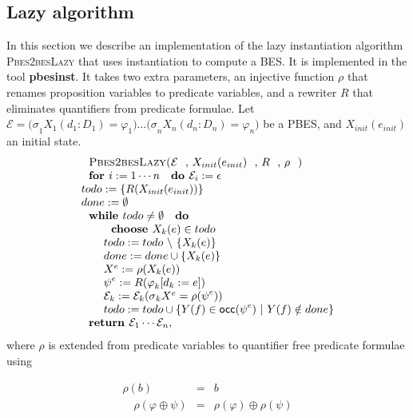 \subsection{Lazy algorithm}

In this section we describe an implementation of the lazy instantiation
algorithm \textsc{Pbes2besLazy} that uses instantiation to compute a BES. It
is implemented in the tool \textbf{pbesinst}. It takes two extra parameters,
an injective function $\rho $ that renames proposition variables to
predicate variables, and a rewriter $R$ that eliminates quantifiers from
predicate formulae. Let $\mathcal{E=(\sigma }_{1}X_{1}(d_{1}:D_{1})=\varphi
_{1})\ldots \mathcal{(\sigma }_{n}X_{n}(d_{n}:D_{n})=\varphi _{n})$ be a
PBES, and $X_{init}(e_{init})$ an initial state.%
\begin{equation*}
\begin{array}{l}
\text{\textsc{Pbes2besLazy(}}\mathcal{E}\text{, }X_{init}(e_{init})\text{, }R%
\text{, }\rho \text{\textsc{)}} \\ 
\text{\textbf{for }}i:=1\cdots n\text{ \textbf{do }}\mathcal{E}%
_{i}:=\epsilon  \\ 
todo:=\{R(X_{init}(e_{init}))\} \\ 
done:=\emptyset  \\ 
\text{\textbf{while }}todo\neq \emptyset \text{ \textbf{do}} \\ 
\qquad \text{\textbf{choose }}X_{k}(e)\in todo \\ 
\qquad todo:=todo\ \backslash \ \{X_{k}(e)\} \\ 
\qquad done:=done\cup \{X_{k}(e)\} \\ 
\qquad X^{e}:=\rho (X_{k}(e)) \\ 
\qquad \psi ^{e}:=R(\varphi _{k}[d_{k}:=e]) \\ 
\qquad \mathcal{E}_{k}:=\mathcal{E}_{k}(\mathcal{\sigma }_{k}X^{e}=\rho
(\psi ^{e})) \\ 
\qquad todo:=todo\cup \{Y(f)\in \mathsf{occ}(\psi ^{e})\ |\ Y(f)\notin done\}
\\ 
\text{\textbf{return }}\mathcal{E}_{1}\cdots \mathcal{E}_{n},%
\end{array}%
\end{equation*}%
where $\rho $ is extended from predicate variables to quantifier free
predicate formulae using

\begin{eqnarray*}
\rho (b) &=&b \\
\quad \rho (\varphi \oplus \psi ) &=&\rho (\varphi )\oplus \rho (\psi )
\end{eqnarray*}%
\newpage 

